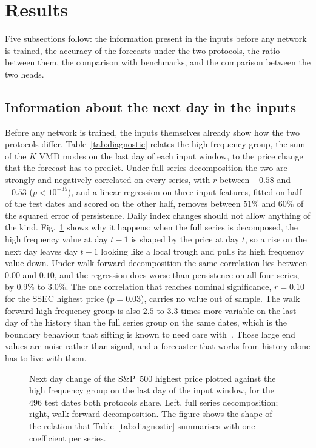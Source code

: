\section{Results}\label{sec:results}

Five subsections follow: the information present in the inputs before any
network is trained, the accuracy of the forecasts under the two protocols, the
ratio between them, the comparison with benchmarks, and the comparison between
the two heads.

\subsection{Information about the next day in the inputs}
Before any network is trained, the inputs themselves already show how the two
protocols differ. Table~\ref{tab:diagnostic} relates the high frequency group,
the sum of the $K$ VMD modes on the last day of each input window, to the price
change that the forecast has to predict. Under full series decomposition the
two are strongly and negatively correlated on every series, with $r$ between
$-0.58$ and $-0.53$ ($p<10^{-35}$), and a linear regression on three input
features, fitted on half of the test dates and scored on the other half,
removes between $51\%$ and $60\%$ of the squared error of persistence. Daily
index changes should not allow anything of the kind. Fig.~\ref{fig:mechanism}
shows why it happens: when the full series is decomposed, the high frequency
value at day $t-1$ is shaped by the price at day $t$, so a rise on the next day
leaves day $t-1$ looking like a local trough and pulls its high frequency value
down. Under walk forward decomposition the same correlation lies between
$0.00$ and $0.10$, and the regression does worse than persistence on all four
series, by $0.9\%$ to $3.0\%$. The one correlation that reaches nominal
significance, $r=0.10$ for the SSEC highest price ($p=0.03$), carries no value
out of sample. The walk forward high frequency group is also $2.5$ to $3.3$
times more variable on the last day of the history than the full series group
on the same dates, which is the boundary behaviour that sifting is known to
need care with~\cite{emdtutorial2023}. Those large end values are noise rather
than signal, and a forecaster that works from history alone has to live with
them.


\begin{figure}[ht]
\centering
{}
\caption{Next day change of the S\&P~500 highest price plotted against the
high frequency group on the last day of the input window, for the $496$ test
dates both protocols share. Left, full series decomposition; right, walk
forward decomposition. The figure shows the shape of the relation that
Table~\ref{tab:diagnostic} summarises with one coefficient per series.}
\label{fig:mechanism}
\end{figure}

